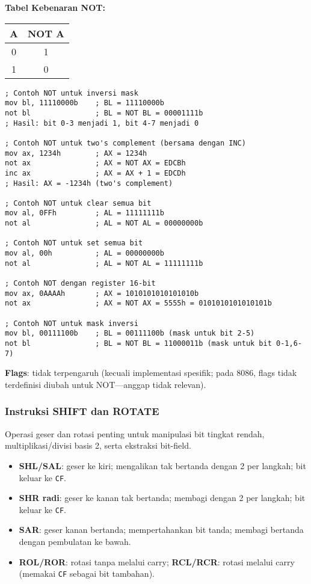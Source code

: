 \documentclass[../main.tex]{subfiles}
\begin{document}
\textbf{Tabel Kebenaran NOT:}
\begin{center}
    \begin{tabular}{|c|c|}
        \hline
        A & NOT A \\
        \hline
        0 & 1 \\
        1 & 0 \\
        \hline
    \end{tabular}
\end{center}

\begin{lstlisting}[language={[x86masm]Assembler}, caption=Instruksi NOT, label={lst:not-examples}]
; Contoh NOT untuk inversi mask
mov bl, 11110000b    ; BL = 11110000b
not bl               ; BL = NOT BL = 00001111b
; Hasil: bit 0-3 menjadi 1, bit 4-7 menjadi 0

; Contoh NOT untuk two's complement (bersama dengan INC)
mov ax, 1234h        ; AX = 1234h
not ax               ; AX = NOT AX = EDCBh
inc ax               ; AX = AX + 1 = EDCDh
; Hasil: AX = -1234h (two's complement)

; Contoh NOT untuk clear semua bit
mov al, 0FFh         ; AL = 11111111b
not al               ; AL = NOT AL = 00000000b

; Contoh NOT untuk set semua bit
mov al, 00h          ; AL = 00000000b
not al               ; AL = NOT AL = 11111111b

; Contoh NOT dengan register 16-bit
mov ax, 0AAAAh       ; AX = 1010101010101010b
not ax               ; AX = NOT AX = 5555h = 0101010101010101b

; Contoh NOT untuk mask inversi
mov bl, 00111100b    ; BL = 00111100b (mask untuk bit 2-5)
not bl               ; BL = NOT BL = 11000011b (mask untuk bit 0-1,6-7)
\end{lstlisting}

\textbf{Flags}: tidak terpengaruh (kecuali implementasi spesifik; pada 8086, flags tidak terdefinisi diubah untuk NOT—anggap tidak relevan).

            \subsubsection{Instruksi SHIFT dan ROTATE}
Operasi geser dan rotasi penting untuk manipulasi bit tingkat rendah, multiplikasi/divisi basis 2, serta ekstraksi bit-field.

\begin{itemize}
    \item \textbf{SHL/SAL}: geser ke kiri; mengalikan tak bertanda dengan 2 per langkah; bit keluar ke \texttt{CF}.
    \item \textbf{SHR radi}: geser ke kanan tak bertanda; membagi dengan 2 per langkah; bit keluar ke \texttt{CF}.
    \item \textbf{SAR}: geser kanan bertanda; mempertahankan bit tanda; membagi bertanda dengan pembulatan ke bawah.
    \item \textbf{ROL/ROR}: rotasi tanpa melalui carry; \textbf{RCL/RCR}: rotasi melalui carry (memakai \texttt{CF} sebagai bit tambahan).
\end{itemize}
\end{document}
